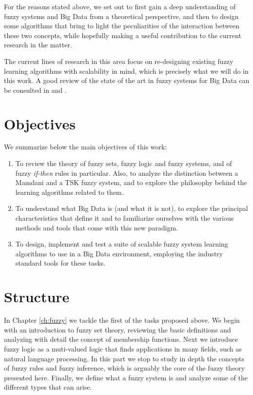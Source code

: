 For the reasons stated above, we set out to first gain a deep understanding of fuzzy systems and Big Data from a theoretical perspective, and then to design some algorithms that bring to light the peculiarities of the interaction between these two concepts, while hopefully making a useful contribution to the current research in the matter.

The current lines of research in this area focus on re-designing existing fuzzy learning algorithms with scalability in mind, which is precisely what we will do in this work. A good review of the state of the art in fuzzy systems for Big Data can be consulted in \cite{wang2017overview} and \cite{fernandez2016view}.

\section{Objectives}

We summarize below the main objectives of this work:

\begin{enumerate}[1.]
  \item To review the theory of fuzzy sets, fuzzy logic and fuzzy systems, and of fuzzy \textit{if-then} rules in particular. Also, to analyze the distinction between a Mamdani and a TSK fuzzy system, and to explore the philosophy behind the learning algorithms related to them.
  \item To understand what Big Data is (and what it is not), to explore the principal characteristics that define it and to familiarize ourselves with the various methods and tools that come with this new paradigm.
  \item To design, implement and test a suite of scalable fuzzy system learning algorithms to use in a Big Data environment, employing the industry standard tools for these tasks.
\end{enumerate}

\section{Structure}

In Chapter \ref{ch:fuzzy} we tackle the first of the tasks proposed above. We begin with an introduction to fuzzy set theory, reviewing the basic definitions and analyzing with detail the concept of membership functions. Next we introduce fuzzy logic as a muti-valued logic that finds applications in many fields, such as natural language processing. In this part we stop to study in depth the concepts of fuzzy rules and fuzzy inference, which is arguably the core of the fuzzy theory presented here. Finally, we define what a fuzzy system is and analyze some of the different types that can arise.

